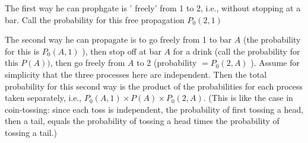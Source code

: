 The first way he can prophgate is ' freely' from 1 to 2, i.e., without stopping at a bar. Call the probability for this free propagation $P_{0}(2,1)$

The second way he can propagate is to go freely from 1 to bar $A$ (the probability for this is $P_{0}(A, 1)$ ), then stop off at bar $A$ for a drink (call the probability for this $P(A))$, then go freely from $A$ to 2 (probability $=P_{0}(2, A)$ ). Assume for simplicity that the three processes here are independent. Then the total probability for this second way is the product of the probabilities for each process taken separately, i.e., $P_{0}(A, 1) \times P(A) \times P_{0}(2, A) .$ (This is like the case in coin-tossing: since each toss is independent, the probability of first tossing a head, then a tail, equals the probability of tossing a head times the probability of tossing a tail.)

